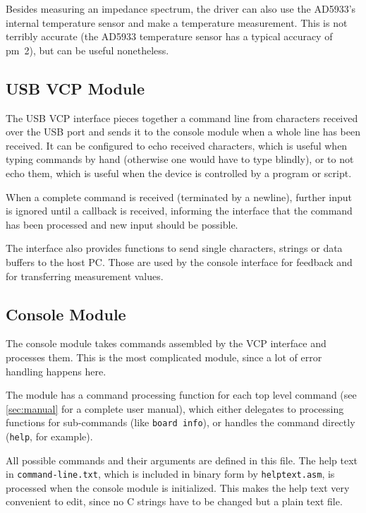 Besides measuring an impedance spectrum, the driver can also use the AD5933's internal temperature sensor and make a
temperature measurement. This is not terribly accurate (the AD5933 temperature sensor has a typical accuracy of
\unit{\pm 2}{\celsius}), but can be useful nonetheless.


\subsection{USB VCP Module}

The USB VCP interface pieces together a command line from characters received over the USB port and sends it to the
console module when a whole line has been received. It can be configured to echo received characters, which is useful
when typing commands by hand (otherwise one would have to type blindly), or to not echo them, which is useful when
the device is controlled by a program or script.

When a complete command is received (terminated by a newline), further input is ignored until a callback is received,
informing the interface that the command has been processed and new input should be possible.

The interface also provides functions to send single characters, strings or data buffers to the host PC.
Those are used by the console interface for feedback and for transferring measurement values.


\subsection{Console Module}

The console module takes commands assembled by the VCP interface and processes them. This is the most complicated
module, since a lot of error handling happens here.

The module has a command processing function for each top level command (see \autoref{sec:manual} for a complete
user manual), which either delegates to processing functions for sub-commands (like \texttt{board info}), or
handles the command directly (\texttt{help}, for example).

All possible commands and their arguments are defined in this file. The help text in \verb!command-line.txt!, which
is included in binary form by \verb!helptext.asm!, is processed when the console module is initialized. This makes
the help text very convenient to edit, since no C strings have to be changed but a plain text file.


